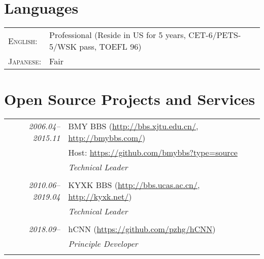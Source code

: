 \documentclass[paper=a4,fontsize=11pt]{scrartcl}
\begin{document}


\section*{Languages}

\begin{tabular}{ll}
	
	\textsc{English:} & Professional (Reside in US for 5 years, CET-6/PETS-5/WSK pass, TOEFL 96) \\
	
	\textsc{Japanese:} & Fair\\
\end{tabular}



\section*{Open Source Projects and Services}

\begin{tabular}{r|p{11cm}}
	\emph{2006.04--2015.11} & BMY BBS (\href{http://bbs.xjtu.edu.cn/}{http://bbs.xjtu.edu.cn/}, \href{http://bmybbs.com/}{http://bmybbs.com/}) \\
	& Host: \href{https://github.com/bmybbs?type=source}{https://github.com/bmybbs?type=source} \\
	& \emph{Technical Leader} \\ 
	\multicolumn{2}{c}{} \\
	
	\emph{2010.06--2019.04} & KYXK BBS (\href{http://bbs.ucas.ac.cn/}{http://bbs.ucas.ac.cn/}, \href{http://kyxk.net/}{http://kyxk.net/}) \\
	& \emph{Technical Leader} \\ 
	\multicolumn{2}{c}{} \\
	
	\emph{2018.09--} & hCNN (\href{https://github.com/pzhg/hCNN}{https://github.com/pzhg/hCNN}) \\
	& \emph{Principle Developer} \\ 
	\multicolumn{2}{c}{}
\end{tabular}
\end{document}

